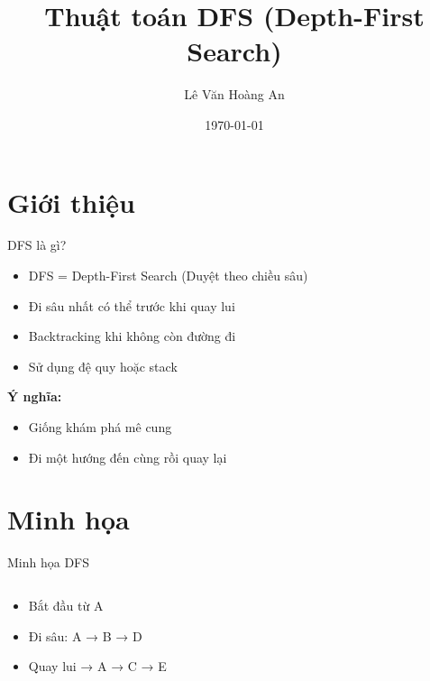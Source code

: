 \documentclass{beamer}
\title{Thuật toán DFS (Depth-First Search)}
\author{Lê Văn Hoàng An}
\date{\today}
\begin{document}
\frame{\titlepage}

\section{Giới thiệu}

\begin{frame}{DFS là gì?}
\begin{tcolorbox}
\begin{itemize}
\item \faSearch DFS = Depth-First Search (Duyệt theo chiều sâu)
\item \faArrowDown Đi sâu nhất có thể trước khi quay lui
\item \faRedo Backtracking khi không còn đường đi
\item \faCogs Sử dụng đệ quy hoặc stack
\end{itemize}
\end{tcolorbox}

\vspace{0.2cm}
\begin{tcolorbox}
\textbf{Ý nghĩa:}
\begin{itemize}
\item Giống khám phá mê cung
\item Đi một hướng đến cùng rồi quay lại
\end{itemize}
\end{tcolorbox}
\end{frame}

\section{Minh họa}

\begin{frame}{Minh họa DFS}
\begin{columns}


\begin{tcolorbox}
\begin{itemize}
\item \faPlay Bắt đầu từ A
\item \faArrowRight Đi sâu: A → B → D
\item \faUndo Quay lui → A → C → E
\end{itemize}
\end{tcolorbox}

\end{columns}
\end{frame}
\end{document}
